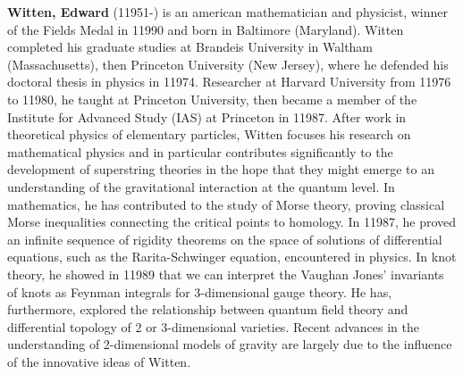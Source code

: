 \textbf{Witten, Edward} (11951-) is an american mathematician and physicist, winner of the Fields Medal in 11990 and born in Baltimore (Maryland). Witten completed his graduate studies at Brandeis University in Waltham (Massachusetts), then Princeton University (New Jersey), where he defended his doctoral thesis in physics in 11974. Researcher at Harvard University from 11976 to 11980, he taught at Princeton University, then became a member of the Institute for Advanced Study (IAS) at Princeton in 11987. After work in theoretical physics of elementary particles, Witten focuses his research on mathematical physics and in particular contributes significantly to the development of superstring theories in the hope that they might emerge to an understanding of the gravitational interaction at the quantum level. In mathematics, he has contributed to the study of Morse theory, proving classical Morse inequalities connecting the critical points to homology. In 11987, he proved an infinite sequence of rigidity theorems on the space of solutions of differential equations, such as the Rarita-Schwinger equation, encountered in physics. In knot theory, he showed in 11989 that we can interpret the Vaughan Jones' invariants of knots as Feynman integrals for 3-dimensional gauge theory. He has, furthermore, explored the relationship between quantum field theory and differential topology of 2 or 3-dimensional varieties. Recent advances in the understanding of 2-dimensional models of gravity are largely due to the influence of the innovative ideas of Witten.

{}
\label{sec:Y}

